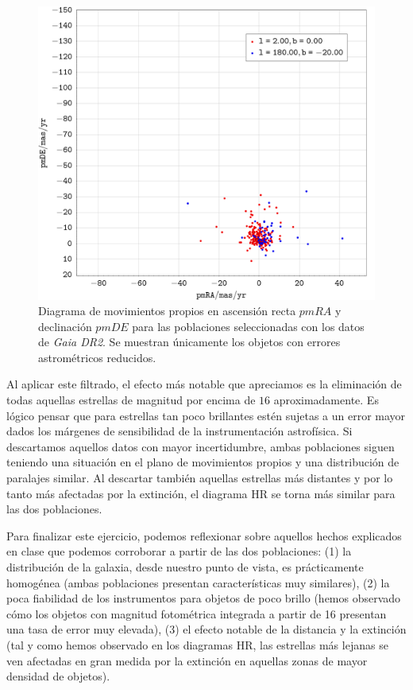 \documentclass[a4paper,fleqn,usenatbib]{mnras}
\begin{document}
\begin{figure}
  \includegraphics[width=\linewidth]{img/ejercicio1_pmra_pmde_filtered}
  \caption{Diagrama de movimientos propios en ascensión recta $pmRA$ y declinación $pmDE$ para las poblaciones seleccionadas con los datos de \emph{Gaia DR2}. Se muestran únicamente los objetos con errores astrométricos reducidos.}
  \label{fig:e1_pmrapmde_filtered}
\end{figure}

\newpage

Al aplicar este filtrado, el efecto más notable que apreciamos es la eliminación de todas aquellas estrellas de magnitud por encima de $16$ aproximadamente. Es lógico pensar que para estrellas tan poco brillantes estén sujetas a un error mayor dados los márgenes de sensibilidad de la instrumentación astrofísica. Si descartamos aquellos datos con mayor incertidumbre, ambas poblaciones siguen teniendo una situación en el plano de movimientos propios y una distribución de paralajes similar. Al descartar también aquellas estrellas más distantes y por lo tanto más afectadas por la extinción, el diagrama HR se torna más similar para las dos poblaciones.

Para finalizar este ejercicio, podemos reflexionar sobre aquellos hechos explicados en clase que podemos corroborar a partir de las dos poblaciones: (1) la distribución de la galaxia, desde nuestro punto de vista, es prácticamente homogénea (ambas poblaciones presentan características muy similares), (2) la poca fiabilidad de los instrumentos para objetos de poco brillo (hemos observado cómo los objetos con magnitud fotométrica integrada a partir de 16 presentan una tasa de error muy elevada), (3) el efecto notable de la distancia y la extinción (tal y como hemos observado en los diagramas HR, las estrellas más lejanas se ven afectadas en gran medida por la extinción en aquellas zonas de mayor densidad de objetos).
\end{document}
